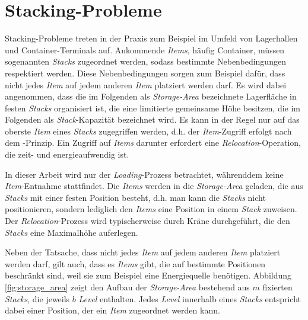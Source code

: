 \section{Stacking-Probleme}
\label{sec:stacking_problems}

Stacking-Probleme treten in der Praxis zum Beispiel im Umfeld von Lagerhallen und Container-Terminals auf.
Ankommende \textit{Items}, häufig Container, müssen sogenannten \textit{Stacks} zugeordnet werden, sodass bestimmte Nebenbedingungen respektiert werden.
Diese Nebenbedingungen sorgen zum Beispiel dafür, dass nicht jedes \textit{Item} auf jedem anderen \textit{Item} platziert werden
darf. Es wird dabei angenommen, dass die im Folgenden als \textit{Storage-Area} bezeichnete Lagerfläche in festen
\textit{Stacks} organisiert ist, die eine limitierte gemeinsame Höhe besitzen, die im Folgenden als \textit{Stack}-Kapazität bezeichnet wird.\newline
Es kann in der Regel nur auf das oberste \textit{Item} eines \textit{Stacks} zugegriffen werden, d.h. der \textit{Item}-Zugriff erfolgt
nach dem -Prinzip. Ein Zugriff auf \textit{Items} darunter erfordert eine \textit{Relocation}-Operation, die
zeit- und energieaufwendig ist.\newline

In dieser Arbeit wird nur der \textit{Loading}-Prozess betrachtet, währenddem keine \textit{Item}-Entnahme stattfindet.
Die \textit{Items} werden in die \textit{Storage-Area} geladen, die aus \textit{Stacks} mit einer festen Position besteht, d.h.
man kann die \textit{Stacks} nicht positionieren, sondern lediglich den \textit{Items} eine Position in einem \textit{Stack} zuweisen.\newline
Der \textit{Relocation}-Prozess wird typischerweise durch Kräne durchgeführt, die den \textit{Stacks} eine Maximalhöhe auferlegen.

Neben der Tatsache, dass nicht jedes \textit{Item} auf jedem anderen \textit{Item} platziert werden darf, gilt auch, dass es \textit{Items} gibt, die auf bestimmte Positionen beschränkt sind, weil sie zum Beispiel eine Energiequelle benötigen.
Abbildung \ref{fig:storage_area} zeigt den Aufbau der \textit{Storage-Area} bestehend aus $m$ fixierten
\textit{Stacks}, die jeweils $b$ \textit{Level} enthalten. Jedes \textit{Level} innerhalb eines \textit{Stacks} entspricht dabei einer Position, der ein \textit{Item} zugeordnet werden kann.

